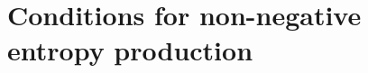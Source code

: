 \documentclass[12pt]{iopart}
\newcommand\eqref[1]{(\ref{#1})}
\begin{document}
		
			
			
			\section{Conditions for non-negative entropy production} \label{inequality}
			
\end{document}

